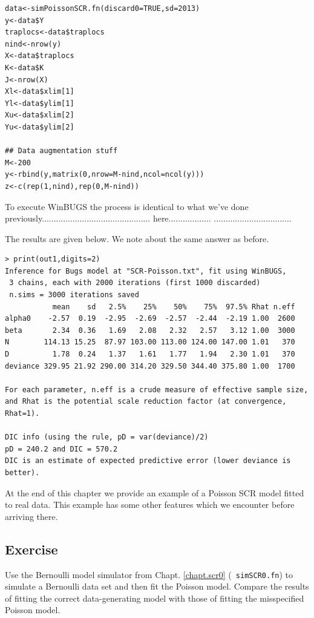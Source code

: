 \begin{verbatim}
data<-simPoissonSCR.fn(discard0=TRUE,sd=2013)
y<-data$Y
traplocs<-data$traplocs
nind<-nrow(y)
X<-data$traplocs
K<-data$K
J<-nrow(X)
Xl<-data$xlim[1]
Yl<-data$ylim[1]
Xu<-data$xlim[2]
Yu<-data$ylim[2]

## Data augmentation stuff
M<-200
y<-rbind(y,matrix(0,nrow=M-nind,ncol=ncol(y)))
z<-c(rep(1,nind),rep(0,M-nind))
\end{verbatim}

To execute WinBUGS the process is identical to what we've done
previously..............................................
here..................
.................................

The results are given below. We note about the same answer as before.

{\small
\begin{verbatim}
> print(out1,digits=2)
Inference for Bugs model at "SCR-Poisson.txt", fit using WinBUGS,
 3 chains, each with 2000 iterations (first 1000 discarded)
 n.sims = 3000 iterations saved
           mean    sd   2.5%    25%    50%    75%  97.5% Rhat n.eff
alpha0    -2.57  0.19  -2.95  -2.69  -2.57  -2.44  -2.19 1.00  2600
beta       2.34  0.36   1.69   2.08   2.32   2.57   3.12 1.00  3000
N        114.13 15.25  87.97 103.00 113.00 124.00 147.00 1.01   370
D          1.78  0.24   1.37   1.61   1.77   1.94   2.30 1.01   370
deviance 329.95 21.92 290.00 314.20 329.50 344.40 375.80 1.00  1700

For each parameter, n.eff is a crude measure of effective sample size,
and Rhat is the potential scale reduction factor (at convergence, Rhat=1).

DIC info (using the rule, pD = var(deviance)/2)
pD = 240.2 and DIC = 570.2
DIC is an estimate of expected predictive error (lower deviance is better).
\end{verbatim}


At the end of this chapter we provide an example of a Poisson SCR model fitted to 
real data. This example has some other features which we encounter before
arriving there. 

\subsection{Exercise}

Use the Bernoulli model simulator from Chapt. \ref{chapt.scr0} (\mbox{\tt
  simSCR0.fn}) to simulate a Bernoulli data set and then fit the
Poisson model. Compare the results of fitting the correct
data-generating model with those of fitting the misspecified Poisson
model. 



}
